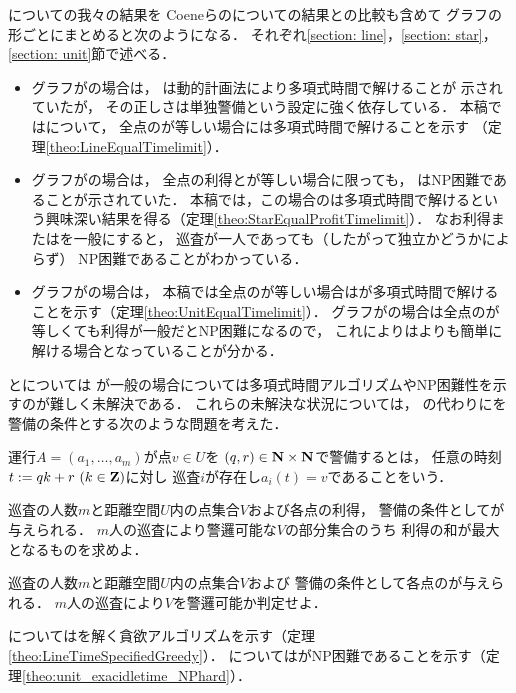 {\patProb}についての我々の結果を
Coeneらの{\independentPatProb}についての結果との比較も含めて
グラフの形ごとにまとめると次のようになる．
それぞれ\ref{section: line}，\ref{section: star}，\ref{section: unit}節で述べる．
\begin{itemize}
\item 
  グラフが{\graphLine}の場合は，
  {\independentPatProb}は動的計画法により多項式時間で解けることが
  示されていた\cite[Theorem~11]{coene2011charlemagne}が，
  その正しさは単独警備という設定に強く依存している．
  本稿では{\patProb}について，
  全点の{\maxIdletime}が等しい場合には多項式時間で解けることを示す
  （定理\ref{theo:LineEqualTimelimit}）．
\item
  グラフが{\graphStar}の場合は，
  全点の利得と{\maxIdletime}が等しい場合に限っても，
  {\independentPatProb}はNP困難であることが示されていた\cite[Theorem~10]{coene2011charlemagne}．
  本稿では，この場合の{\patProb}は多項式時間で解けるという興味深い結果を得る（定理\ref{theo:StarEqualProfitTimelimit}）．
  なお利得または{\maxIdletime}を一般にすると，
  巡査が一人であっても（したがって独立かどうかによらず）
  NP困難であることがわかっている\cite[Theorems 5 and 6]{coene2011charlemagne}．
\item 
  グラフが{\graphUnit}の場合は，
  本稿では全点の{\maxIdletime}が等しい場合は{\patProb}が多項式時間で解けることを示す（定理\ref{theo:UnitEqualTimelimit}）．
  グラフが{\graphStar}の場合は全点の{\maxIdletime}が等しくても利得が一般だとNP困難になるので，
  これにより{\graphUnit}は{\graphStar}よりも簡単に解ける場合となっていることが分かる．
\end{itemize}


{\graphLine}と{\graphUnit}については
{\maxIdletime}が一般の場合については多項式時間アルゴリズムやNP困難性を示すのが難しく未解決である．
これらの未解決な状況については，
{\maxIdletime}の代わりに{\exactIdletime}を警備の条件とする次のような問題を考えた．

\begin{defi}
運行$A = (a _1, \ldots, a _m)$が点$v \in U$を
{\exactIdletime}$(q, r) \in \mathbf N \times \mathbf N$で警備するとは，
任意の時刻$t := q k + r\ (k \in \mathbf Z)$に対し
巡査$i$が存在し$a _i (t) = v$であることをいう．
\end{defi}

\begin{timeSpecifiedPatrollingProblem}
巡査の人数$m$と距離空間$U$内の点集合$V$および各点の利得，
警備の条件として{\exactIdletime}が与えられる．
$m$人の巡査により警邏可能な$V$の部分集合のうち
利得の和が最大となるものを求めよ．
\end{timeSpecifiedPatrollingProblem}

\begin{timeSpecifiedPatrollingProblemDecision}
巡査の人数$m$と距離空間$U$内の点集合$V$および
警備の条件として各点の{\exactIdletime}が与えられる．
$m$人の巡査により$V$を警邏可能か判定せよ．
\end{timeSpecifiedPatrollingProblemDecision}


{\graphLine}については{\timeSpecifiedPatProbDecision}を解く貪欲アルゴリズムを示す（定理\ref{theo:LineTimeSpecifiedGreedy}）．
{\graphUnit}については{\timeSpecifiedPatProb}がNP困難であることを示す（定理\ref{theo:unit_exacidletime_NPhard}）．
